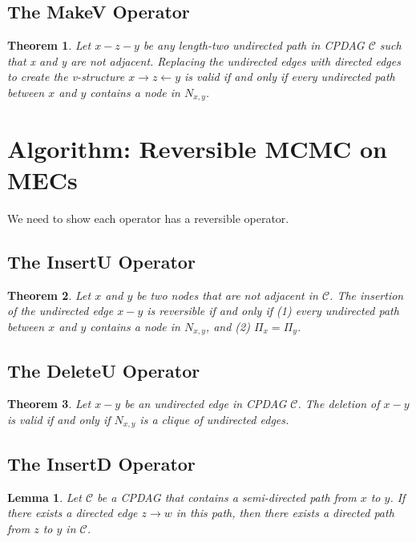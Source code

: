 \documentclass{article}
\newtheorem{theorem}{Theorem}[section]
\newtheorem{lemma}{Lemma}[section]
\theoremstyle{definition}
\newcommand{\cC}{\mathcal{C}}
\newcommand{\<}{\left\langle}
\renewcommand{\>}{\right\rangle}
\begin{document}
\subsection{The MakeV Operator}
\begin{theorem}
    Let $x - z - y$ be any length-two undirected path in CPDAG $\cC$ such that x and y are not adjacent. Replacing the undirected edges with directed edges to create the v-structure $x \rightarrow z \leftarrow y$ is valid if and only if every undirected path between $x$ and $y$ contains a node in $N_{x,y}$.
\end{theorem}

\section{Algorithm: Reversible MCMC on MECs}

We need to show each operator has a reversible operator.

\subsection{The InsertU Operator}
\begin{theorem}
    Let $x$ and $y$ be two nodes that are not adjacent in $\cC$. The insertion of the undirected edge $x - y$ is reversible if and only if (1) every undirected path between $x$ and $y$ contains a node in $N_{x,y}$, and (2) $\Pi_x = \Pi_y$.
\end{theorem}

\subsection{The DeleteU Operator}
\begin{theorem}
    Let $x - y$ be an undirected edge in CPDAG $\cC$. The deletion of $x - y$ is valid if and only if $N_{x,y}$ is a clique of undirected edges.
\end{theorem}

\subsection{The InsertD Operator}
\begin{lemma}
    Let $\cC$ be a CPDAG that contains a semi-directed path from $x$ to $y$. If there exists a directed edge $z \rightarrow w$ in this path, then there exists a directed path from $z$ to $y$ in $\cC$.
\end{lemma}
\end{document}

